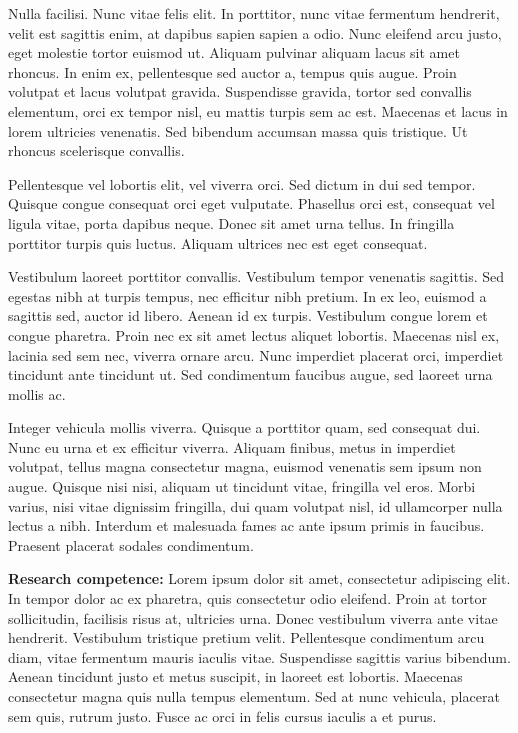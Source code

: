 \documentclass[12pt]{article}
\begin{document}
Nulla facilisi. Nunc vitae felis elit. In porttitor, nunc vitae fermentum hendrerit, velit est sagittis enim, at dapibus sapien sapien a odio. Nunc eleifend arcu justo, eget molestie tortor euismod ut. Aliquam pulvinar aliquam lacus sit amet rhoncus. In enim ex, pellentesque sed auctor a, tempus quis augue. Proin volutpat et lacus volutpat gravida. Suspendisse gravida, tortor sed convallis elementum, orci ex tempor nisl, eu mattis turpis sem ac est. Maecenas et lacus in lorem ultricies venenatis. Sed bibendum accumsan massa quis tristique. Ut rhoncus scelerisque convallis. 

Pellentesque vel lobortis elit, vel viverra orci. Sed dictum in dui sed tempor. Quisque congue consequat orci eget vulputate. Phasellus orci est, consequat vel ligula vitae, porta dapibus neque. Donec sit amet urna tellus. In fringilla porttitor turpis quis luctus. Aliquam ultrices nec est eget consequat.

Vestibulum laoreet porttitor convallis. Vestibulum tempor venenatis sagittis. Sed egestas nibh at turpis tempus, nec efficitur nibh pretium. In ex leo, euismod a sagittis sed, auctor id libero. Aenean id ex turpis. Vestibulum congue lorem et congue pharetra. Proin nec ex sit amet lectus aliquet lobortis. Maecenas nisl ex, lacinia sed sem nec, viverra ornare arcu. Nunc imperdiet placerat orci, imperdiet tincidunt ante tincidunt ut. Sed condimentum faucibus augue, sed laoreet urna mollis ac.

Integer vehicula mollis viverra. Quisque a porttitor quam, sed consequat dui. Nunc eu urna et ex efficitur viverra. Aliquam finibus, metus in imperdiet volutpat, tellus magna consectetur magna, euismod venenatis sem ipsum non augue. Quisque nisi nisi, aliquam ut tincidunt vitae, fringilla vel eros. Morbi varius, nisi vitae dignissim fringilla, dui quam volutpat nisl, id ullamcorper nulla lectus a nibh. Interdum et malesuada fames ac ante ipsum primis in faucibus. Praesent placerat sodales condimentum. 

\vskip 2mm
\noindent
{\bf Research competence:}
 Lorem ipsum dolor sit amet, consectetur adipiscing elit. In tempor dolor ac ex pharetra, quis consectetur odio eleifend. Proin at tortor sollicitudin, facilisis risus at, ultricies urna. Donec vestibulum viverra ante vitae hendrerit. Vestibulum tristique pretium velit. Pellentesque condimentum arcu diam, vitae fermentum mauris iaculis vitae. Suspendisse sagittis varius bibendum. Aenean tincidunt justo et metus suscipit, in laoreet est lobortis. Maecenas consectetur magna quis nulla tempus elementum. Sed at nunc vehicula, placerat sem quis, rutrum justo. Fusce ac orci in felis cursus iaculis a et purus.
\end{document}
